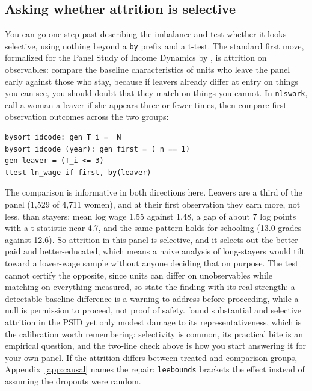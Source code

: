 \documentclass[
    a4paper,
    fontsize=10pt,
    twoside=true,
    numbers=noenddot,
]{kaobook}
\begin{document}
\subsection{Asking whether attrition is selective}\label{sec:ch06-attrition}
You can go one step past describing the imbalance and test whether it looks selective, using nothing beyond a \texttt{by} prefix and a t-test. The standard first move, formalized for the Panel Study of Income Dynamics by \textcite{fitzgerald1998attrition}, is attrition on observables: compare the baseline characteristics of units who leave the panel early against those who stay, because if leavers already differ at entry on things you can see, you should doubt that they match on things you cannot. In \texttt{nlswork}, call a woman a leaver if she appears three or fewer times, then compare first-observation outcomes across the two groups:
\par
{\footnotesize
\begin{verbatim}
bysort idcode: gen T_i = _N
bysort idcode (year): gen first = (_n == 1)
gen leaver = (T_i <= 3)
ttest ln_wage if first, by(leaver)
\end{verbatim}
}
The comparison is informative in both directions here. Leavers are a third of the panel (1{,}529 of 4{,}711 women), and at their first observation they earn more, not less, than stayers: mean log wage 1.55 against 1.48, a gap of about 7 log points with a t-statistic near 4.7, and the same pattern holds for schooling (13.0 grades against 12.6). So attrition in this panel is selective, and it selects out the better-paid and better-educated, which means a naive analysis of long-stayers would tilt toward a lower-wage sample without anyone deciding that on purpose. The test cannot certify the opposite, since units can differ on unobservables while matching on everything measured, so state the finding with its real strength: a detectable baseline difference is a warning to address before proceeding, while a null is permission to proceed, not proof of safety. \textcite{fitzgerald1998attrition} found substantial and selective attrition in the PSID yet only modest damage to its representativeness, which is the calibration worth remembering: selectivity is common, its practical bite is an empirical question, and the two-line check above is how you start answering it for your own panel. If the attrition differs between treated and comparison groups, Appendix~\ref{app:causal} names the repair: \texttt{leebounds} brackets the effect instead of assuming the dropouts were random.
\end{document}
